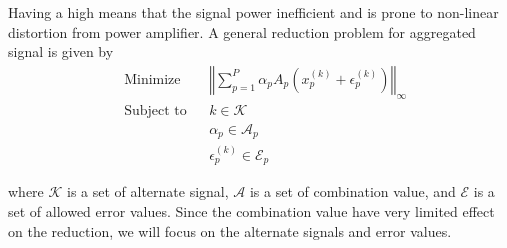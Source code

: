\documentclass[conference]{IEEEtran}
\begin{document}
Having a high \PAR means that the signal power inefficient and is prone to non-linear distortion from power amplifier.  A general \PAR reduction problem for aggregated signal is given by 
\begin{equation}
     \begin{aligned}
      &\text{Minimize } & &\left\Vert\sum_{p=1}^P\alpha_pA_p\left(x_p^{(k)}+\epsilon_p^{(k)}\right)\right\Vert_\infty  \\
      &\text{Subject to} &  &k\in \mathcal{K} \\
      & & &\alpha_p\in\mathcal{A}_p\\
      & & &\epsilon_p^{(k)}\in\mathcal{E}_p 
     \end{aligned}
\end{equation}

where $\mathcal{K}$ is a set of alternate signal, $\mathcal{A}$ is a set of combination value, and $\mathcal{E}$ is a set of allowed error values.  Since the combination value have very limited effect on the \PAR reduction, we will focus on the alternate signals and error values.
\end{document}
